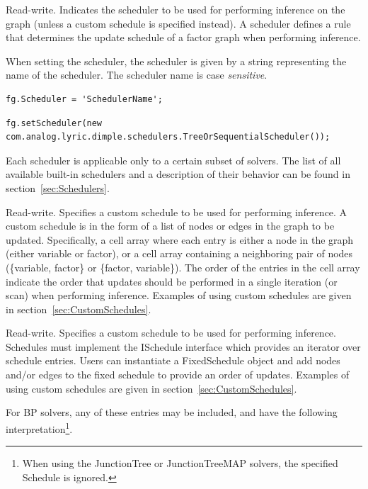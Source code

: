 Read-write.  Indicates the scheduler to be used for performing inference on the graph (unless a custom schedule is specified instead).  A scheduler defines a rule that determines the update schedule of a factor graph when performing inference.

When setting the scheduler, the scheduler is given by a string representing the name of the scheduler.  The scheduler name is case \emph{sensitive}.

\ifmatlab
\begin{lstlisting}
fg.Scheduler = 'SchedulerName';
\end{lstlisting}
\fi

\ifjava
\begin{lstlisting}
fg.setScheduler(new com.analog.lyric.dimple.schedulers.TreeOrSequentialScheduler());
\end{lstlisting}
\fi

Each scheduler is applicable only to a certain subset of solvers.  The list of all available built-in schedulers and a description of their behavior can be found in section~\ref{sec:Schedulers}.

\label{sec:FactorGraph.Schedule}

\ifmatlab
Read-write.  Specifies a custom schedule to be used for performing inference.  A custom schedule is in the form of a list of nodes or edges in the graph to be updated.  Specifically, a cell array where each entry is either a node in the graph (either variable or factor), or a cell array containing a neighboring pair of nodes (\{variable, factor\} or \{factor, variable\}).  The order of the entries in the cell array indicate the order that updates should be performed in a single iteration (or scan) when performing inference.  Examples of using custom schedules are given in section~\ref{sec:CustomSchedules}.
\fi

\ifjava
Read-write.  Specifies a custom schedule to be used for performing inference.  Schedules must implement the ISchedule interface which provides an iterator over schedule entries.  Users can instantiate a FixedSchedule object and add nodes and/or edges to the fixed schedule to provide an order of updates.  Examples of using custom schedules are given in section~\ref{sec:CustomSchedules}.
\fi

For BP solvers, any of these entries may be included, and have the following interpretation\footnote{When using the JunctionTree or JunctionTreeMAP solvers, the specified Schedule is ignored.}.


